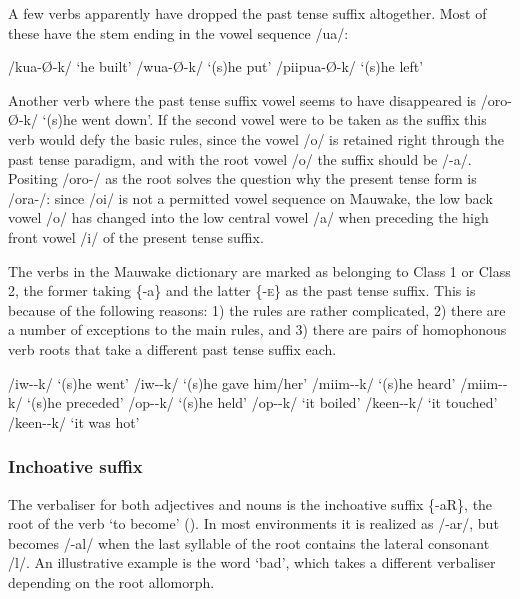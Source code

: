 A few verbs apparently have dropped the past tense suffix altogether.  Most of these have the stem ending in the vowel sequence /ua/:

\ea
\ea
/kua-{\O-k}/  `he built'
\ex
/wua-{\O-k}/  `(s)he put'
\ex
/piipua-{\O-k}/  `(s)he left'
\z
\z

Another verb where the past tense suffix vowel seems to have disappeared is /oro-{\O}-k/ `(s)he went down'.  If the second vowel were to be taken as the suffix this verb would defy the basic rules, since the vowel /o/ is retained right through the past tense paradigm, and with the root vowel /o/ the suffix should be /-a/.  Positing /oro-/ as the root solves the question why the present tense form is /ora-/: since /oi/ is not a permitted vowel sequence on Mauwake, the low back vowel /o/ has changed into the low central vowel /a/ when preceding the high front vowel /i/ of the present tense suffix.

The verbs in the Mauwake dictionary are marked as belonging to Class 1 or Class 2, the former taking \{-a\} and the latter \{-\textsc{e}\} as the past tense suffix. This is because of the following reasons: 1) the rules are rather complicated, 2) there are a number of exceptions to the main rules, and 3) there are pairs of homophonous verb roots that take a different past tense suffix each.

\ea
\ea
/iw--k/  `(s)he went'
\ex
/iw--k/  `(s)he gave him/her'
\ex
/miim--k/  `(s)he heard'
\ex
/miim--k/  `(s)he preceded'
\ex
/op--k/  `(s)he held'
\ex
/op--k/  `it boiled'
\ex
/keen--k/  `it touched'
\ex
/keen--k/  `it was hot'
\z
\z

\subsubsection{Inchoative suffix} \label{sec:2.3.3.4}

The verbaliser for both adjectives and nouns is the inchoative suffix \{-aR\}, the root of the verb `to become' ().  In most environments it is realized as /\nobreakdash-ar/, but becomes /-al/ when the last syllable of the root contains the lateral consonant /l/.  An illustrative example is the word  `bad', which takes a different verbaliser depending on the root allomorph.


